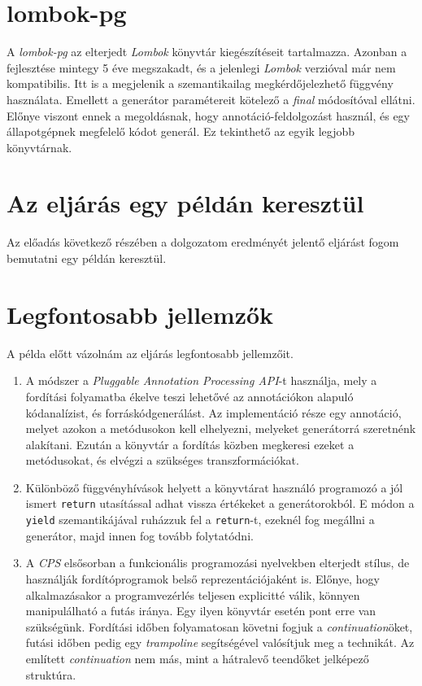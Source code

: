 \documentclass[12pt, a4paper]{article}
\begin{document}
\section{lombok-pg}
A \textit{lombok-pg} az elterjedt \textit{Lombok} könyvtár kiegészítéseit tartalmazza. Azonban a fejlesztése mintegy 5 éve megszakadt, és a jelenlegi \textit{Lombok} verzióval már nem kompatibilis. Itt is a megjelenik a szemantikailag megkérdőjelezhető függvény használata. Emellett a generátor paramétereit kötelező a \textit{final} módosítóval ellátni. Előnye viszont ennek a megoldásnak, hogy annotáció-feldolgozást használ, és egy állapotgépnek megfelelő kódot generál. Ez tekinthető az egyik legjobb könyvtárnak.

\section{Az eljárás egy példán keresztül}
Az előadás következő részében a dolgozatom eredményét jelentő eljárást fogom bemutatni egy példán keresztül.

\section{Legfontosabb jellemzők}

A példa előtt vázolnám az eljárás legfontosabb jellemzőit.

\begin{enumerate}
    \item
    A módszer a \textit{Pluggable Annotation Processing API}-t használja, mely a fordítási folyamatba ékelve teszi lehetővé az annotációkon alapuló kódanalízist, és forráskódgenerálást. Az implementáció része egy annotáció, melyet azokon a metódusokon kell elhelyezni, melyeket generátorrá szeretnénk alakítani. Ezután a könyvtár a fordítás közben megkeresi ezeket a metódusokat, és elvégzi a szükséges transzformációkat.
    \item
    Különböző függvényhívások helyett a könyvtárat használó programozó a jól ismert \texttt{return} utasítással adhat vissza értékeket a generátorokból. E módon a \texttt{yield} szemantikájával ruházzuk fel a \texttt{return}-t, ezeknél fog megállni a generátor, majd innen fog tovább folytatódni.
    \item
    A \textit{CPS} elsősorban a funkcionális programozási nyelvekben elterjedt stílus, de használják fordítóprogramok belső reprezentációjaként is. Előnye, hogy alkalmazásakor a programvezérlés teljesen explicitté válik, könnyen manipulálható a futás iránya. Egy ilyen könyvtár esetén pont erre van szükségünk. Fordítási időben folyamatosan követni fogjuk a \textit{continuation}öket, futási időben pedig egy \textit{trampoline} segítségével valósítjuk meg a technikát. Az említett \textit{continuation} nem más, mint a hátralevő teendőket jelképező struktúra.
\end{enumerate}
\end{document}
